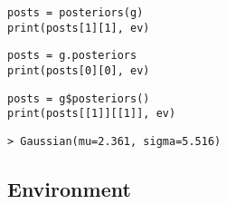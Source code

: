 \documentclass[article]{jss}
\newif\ifen
\newif\ifes
\newcommand{\en}[1]{\ifen#1\fi}
\newcommand{\es}[1]{\ifes#1\fi}
\begin{document}
\en{The posteriors of each agent are Gasussian that can be computed from the likelihoods and priors by calling a method.}
\es{Los posteriors de cada agente son gaussianas que pueden computarse de los likelihoods y priors llamando a un método.}
%
\en{The output has the same order in which the teams and agents were loaded.}
\es{La salida tiene el mismo orden en el que fueron cargados los equipos y los agentes.}
%
\begin{lstlisting}[backgroundcolor=\color{white},label=lst:game_posterior, caption=\relax, belowskip=-1.0 \baselineskip, aboveskip=-0 \baselineskip]
\end{lstlisting}
\begin{paracol}{3}
\begin{lstlisting}[backgroundcolor=\color{julia}, belowskip=-0.77 \baselineskip]
posts = posteriors(g)
print(posts[1][1], ev)
\end{lstlisting}
  \switchcolumn
\begin{lstlisting}[backgroundcolor=\color{python}, belowskip=-0.77 \baselineskip]
posts = g.posteriors
print(posts[0][0], ev)
\end{lstlisting}
   \switchcolumn
\begin{lstlisting}[backgroundcolor=\color{r}, belowskip=-0.77 \baselineskip]
posts = g$posteriors()
print(posts[[1]][[1]], ev)
\end{lstlisting}  
\end{paracol}
\begin{lstlisting}[backgroundcolor=\color{all}]
> Gaussian(mu=2.361, sigma=5.516)
\end{lstlisting}

\subsection{Environment}
\end{document}
